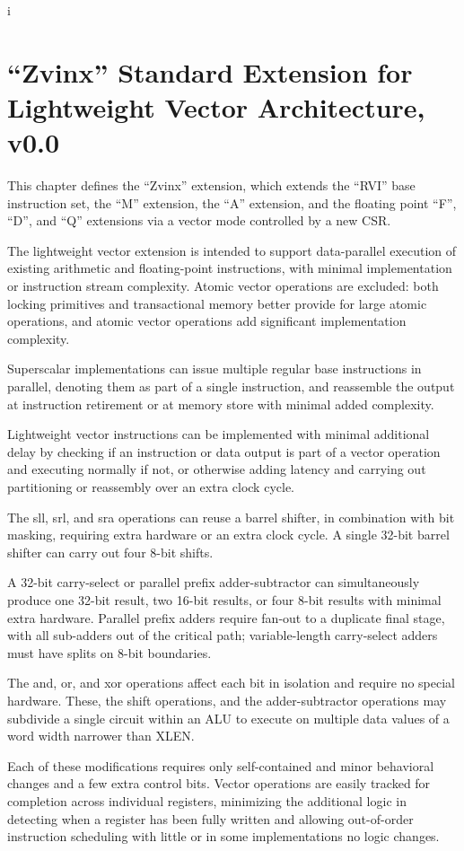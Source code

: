 i%
\chapter{``Zvinx'' Standard Extension for Lightweight Vector Architecture, v0.0}
\label{sec:zvinx}

This chapter defines the ``Zvinx'' extension, which extends the ``RVI'' base
instruction set, the ``M'' extension, the ``A'' extension, and the floating
point ``F'', ``D'', and ``Q'' extensions via a vector mode controlled by a
new CSR.

\begin{commentary}
    The lightweight vector extension is intended to support data-parallel
    execution of existing arithmetic and floating-point instructions, with
    minimal implementation or instruction stream complexity.  Atomic vector
    operations are excluded:  both locking primitives and transactional
    memory better provide for large atomic operations, and atomic vector
    operations add significant implementation complexity.

    Superscalar implementations can issue multiple regular base instructions
    in parallel, denoting them as part of a single instruction, and
    reassemble the output at instruction retirement or at memory store with
    minimal added complexity.

    Lightweight vector instructions can be implemented with minimal additional
    delay by checking if an instruction or data output is part of a vector
    operation and executing normally if not, or otherwise adding latency and
    carrying out partitioning or reassembly over an extra clock cycle.

    The sll, srl, and sra operations can reuse a barrel shifter, in combination
    with bit masking, requiring extra hardware or an extra clock cycle.  A
    single 32-bit barrel shifter can carry out four 8-bit shifts.

    A 32-bit carry-select or parallel prefix adder-subtractor can simultaneously
    produce one 32-bit result, two 16-bit results, or four 8-bit results with
    minimal extra hardware.  Parallel prefix adders require fan-out to a duplicate
    final stage, with all sub-adders out of the critical path; variable-length
    carry-select adders must have splits on 8-bit boundaries.

    The and, or, and xor operations affect each bit in isolation and require no
    special hardware.  These, the shift operations, and the adder-subtractor
    operations may subdivide a single circuit within an ALU to execute on
    multiple data values of a word width narrower than XLEN.

    Each of these modifications requires only self-contained and minor behavioral
    changes and a few extra control bits.  Vector operations are easily tracked
    for completion across individual registers, minimizing the additional logic
    in detecting when a register has been fully written and allowing out-of-order
    instruction scheduling with little or in some implementations no logic changes.
\end{commentary}

